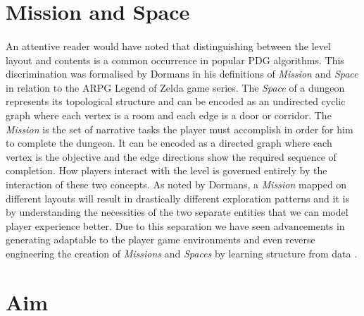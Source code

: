 \documentclass{UoYCSproject}
\begin{document}
\section{Mission and Space}

\paragraph{} %
An attentive reader would have noted that distinguishing between the level layout and contents is a common occurrence in popular PDG algorithms. This discrimination was formalised by Dormans \parencite{DormansMS} in his definitions of \textit{Mission} and \textit{Space} in relation to the ARPG Legend of Zelda game series.
The \textit{Space} of a dungeon represents its topological structure and can be encoded as an undirected cyclic graph where each vertex is a room and each edge is a door or corridor. The \textit{Mission} is the set of narrative tasks the player must accomplish in order for him to complete the dungeon. It can be encoded as a directed graph where each vertex is the objective and the edge directions show the required sequence of completion. How players interact with the level is governed entirely by the interaction of these two concepts. As noted by Dormans, a \textit{Mission} mapped on different layouts will result in drastically different exploration patterns and it is by understanding the necessities of the two separate entities that we can model player experience better. Due to this separation we have seen advancements in generating adaptable to the player game environments \parencite{DormansAE} and even reverse engineering the creation of \textit{Missions} and \textit{Spaces} by learning structure from data \parencite{SummervilleLearningOfZelda}.

\section{Aim}
\end{document}
